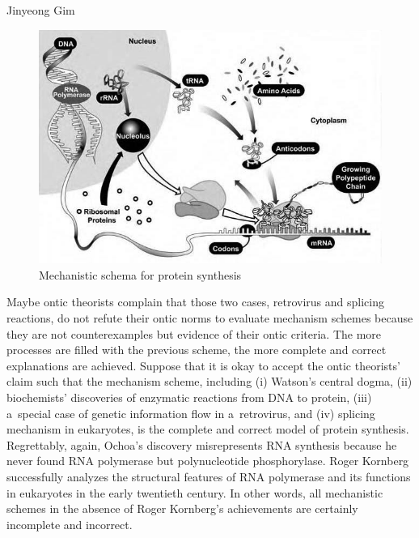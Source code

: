 \begin{artengenv}{Jinyeong Gim}
\begin{figure}[H]
 \begin{center}
 \includegraphics[width=.8\textwidth]{ART_Gim/fig.6300.jpg}%
 \end{center}%
 \caption{Mechanistic schema for protein synthesis
 \parencite[][p.117]{darden_reasoning_2006}}\label{gim.fig6}
\end{figure}

Maybe ontic theorists complain that those two cases, retrovirus and splicing reactions, do not refute their ontic norms to evaluate mechanism schemes because they are not counterexamples but evidence of their ontic criteria. The more processes are filled with the previous scheme, the more complete and correct explanations are achieved. Suppose that it is okay to accept the ontic theorists' claim such that the mechanism scheme, including (i) Watson's central dogma, (ii) biochemists' discoveries of enzymatic reactions from DNA to protein, (iii) a~special case of genetic information flow in a~retrovirus, and (iv) splicing mechanism in eukaryotes, is the complete and correct model of protein synthesis. Regrettably, again, Ochoa's discovery misrepresents RNA synthesis because he never found RNA polymerase but polynucleotide phosphorylase. Roger Kornberg successfully analyzes the structural features of RNA polymerase and its functions in eukaryotes in the early twentieth century. In other words, all mechanistic schemes in the absence of Roger Kornberg's achievements are certainly incomplete and incorrect.


\end{artengenv}
